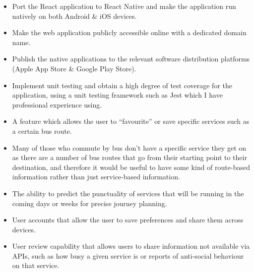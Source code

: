 \documentclass[a4paper,11pt]{article}
\begin{document}
\begin{itemize}
    \item   Port the React application to React Native and make the application run natively on both Android \& iOS devices.
    \item   Make the web application publicly accessible online with a dedicated domain name.
    \item   Publish the native applications to the relevant software distribution platforms (Apple App Store \& Google Play Store).
    \item   Implement unit testing and obtain a high degree of test coverage for the application, using a unit testing framework such as Jest\supercite{jest} which I have professional experience using.
    \item   A feature which allows the user to ``favourite'' or save specific services such as a certain bus route.
    \item   Many of those who commute by bus don't have a specific service they get on as there are a number of bus routes that go from their starting point to their destination, and therefore it would be useful to have some kind of route-based information rather than just service-based information. 
    \item   The ability to predict the punctuality of services that will be running in the coming days or weeks for precise journey planning.
    \item   User accounts that allow the user to save preferences and share them across devices.
    \item   User review capability that allows users to share information not available via APIs, such as how busy a given service is or reports of anti-social behaviour on that service.
\end{itemize}
\end{document}
